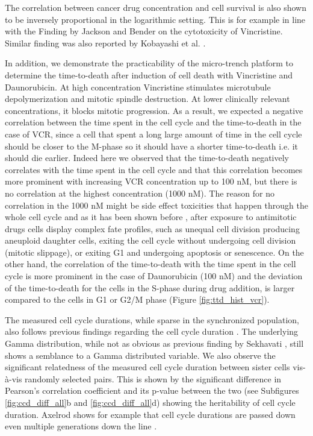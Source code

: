 \documentclass[pdftex,12pt,a4paper]{report}
\begin{document}
The correlation between cancer drug concentration and cell survival is also shown to be inversely proportional in the logarithmic setting. This is for example in line with the Finding by Jackson and Bender \cite{jackson1979cytotoxic} on the cytotoxicity of Vincristine. Similar finding was also reported by Kobayashi et al. \cite{kobayashi1992relationship}.

In addition, we demonstrate the practicability of the micro-trench platform to determine the time-to-death after induction of cell death with Vincristine and Daunorubicin. At high concentration Vincristine stimulates microtubule depolymerization and mitotic spindle destruction. At lower clinically relevant concentrations, it blocks mitotic progression. As a result, we expected a negative correlation between the time spent in the cell cycle and the time-to-death in the case of VCR, since a cell that spent a long large amount of time in the cell cycle should be closer to the M-phase so it should have a shorter time-to-death i.e. it should die earlier. Indeed here we observed that the time-to-death negatively correlates with the time spent in the cell cycle and that this correlation becomes more prominent with increasing VCR concentration up to 100 nM, but there is no correlation at the highest concentration (1000 nM). The reason for no correlation in the 1000 nM might be side effect toxicities that happen through the whole cell cycle and as it has been shown before \cite{gascoigne2008cancer}, after exposure to antimitotic drugs cells display complex fate profiles, such as unequal cell division producing aneuploid daughter cells, exiting the cell cycle without undergoing cell division (mitotic slippage), or exiting G1 and undergoing apoptosis or senescence. On the other hand, the correlation of the time-to-death with the time spent in the cell cycle is more prominent in the case of Daunorubicin (100 nM) and the deviation of the time-to-death for the cells in the S-phase during drug addition, is larger compared to the cells in G1 or G2/M phase (Figure \ref{fig:ttd_hist_vcr}).

The measured cell cycle durations, while sparse in the synchronized population, also follows previous findings regarding the cell cycle duration \cite{sekhavati2015dynamic}. The underlying Gamma distribution, while not as obvious as previous finding by Sekhavati \cite{sekhavati2015dynamic}, still shows a semblance to a Gamma distributed variable. We also observe the significant relatedness of the measured cell cycle duration between sister cells
vis-\`a-vis randomly selected pairs. This is shown by the significant difference in Pearson's correlation coefficient and its p-value between the two (see Subfigures \ref{fig:ccd_diff_all}b and \ref{fig:ccd_diff_all}d) showing the heritability of cell cycle duration. Axelrod \cite{axelrod1993persistence} shows for example that cell cycle durations are passed down even multiple generations down the line \cite{axelrod1993persistence}.
\end{document}
